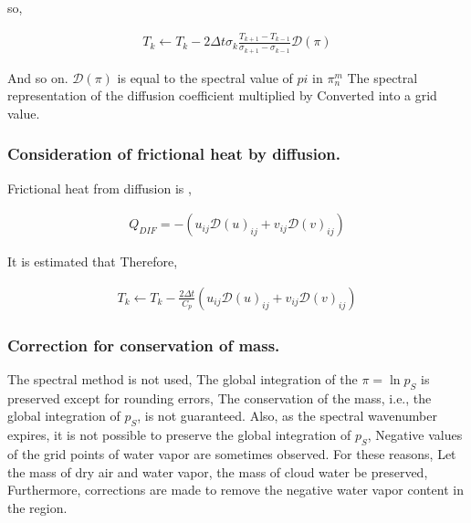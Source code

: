 so,

\begin{eqnarray}
  T_k \leftarrow  T_k 
       -  2 \Delta t
        \sigma_{k} \frac{T_{k+1}-T_{k-1}}{\sigma_{k+1} - \sigma_{k-1}}
        {\mathcal D}(\pi)
\end{eqnarray}

And so on. \({\mathcal D}(\pi)\) is equal to the spectral value of
\(pi\) in \(\pi_n^m\) The spectral representation of the diffusion
coefficient multiplied by Converted into a grid value.

\hypertarget{consideration-of-frictional-heat-by-diffusion.}{%
\subsubsection{Consideration of frictional heat by
diffusion.}\label{consideration-of-frictional-heat-by-diffusion.}}

Frictional heat from diffusion is ,

\begin{eqnarray}
  Q_{DIF} = - \left( u_{ij} {\mathcal D}(u)_{ij} 
                   + v_{ij} {\mathcal D}(v)_{ij} \right)
\end{eqnarray}

It is estimated that Therefore,

\begin{eqnarray}
  T_k \leftarrow  T_k 
       -  \frac{2 \Delta t}{C_p}
           \left( u_{ij} {\mathcal D}(u)_{ij} 
                 + v_{ij} {\mathcal D}(v)_{ij} \right)
\end{eqnarray}

\hypertarget{correction-for-conservation-of-mass.}{%
\subsubsection{Correction for conservation of
mass.}\label{correction-for-conservation-of-mass.}}

The spectral method is not used, The global integration of the
\(\pi = \ln p_S\) is preserved except for rounding errors, The
conservation of the mass, i.e., the global integration of \(p_S\), is
not guaranteed. Also, as the spectral wavenumber expires, it is not
possible to preserve the global integration of \(p_S\), Negative values
of the grid points of water vapor are sometimes observed. For these
reasons, Let the mass of dry air and water vapor, the mass of cloud
water be preserved, Furthermore, corrections are made to remove the
negative water vapor content in the region.

